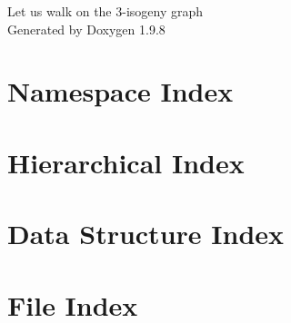 \documentclass[twoside]{book}
\newcommand{\+}{\discretionary{\mbox{\scriptsize$\hookleftarrow$}}{}{}}
\newcommand{\clearemptydoublepage}{%
    \newpage{\pagestyle{empty}\cleardoublepage}%
  }
\begin{document}
  \raggedbottom
    \hypersetup{pageanchor=false,
                bookmarksnumbered=true,
                pdfencoding=unicode
               }
  \begin{titlepage}
  \vspace*{7cm}
  \begin{center}%
  {\Large Let us walk on the 3-\/isogeny graph}\\
  \vspace*{1cm}
  {\large Generated by Doxygen 1.9.8}\\
  \end{center}
  \end{titlepage}
  \clearemptydoublepage
  \tableofcontents
  \clearemptydoublepage
  \hypersetup{pageanchor=true}




\chapter{Namespace Index}

\chapter{Hierarchical Index}

\chapter{Data Structure Index}

\chapter{File Index}

\end{document}
